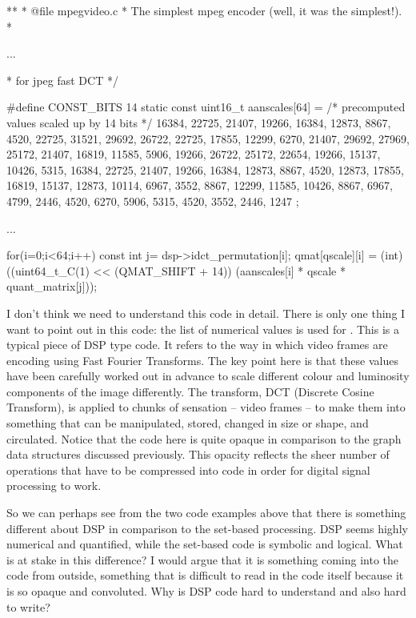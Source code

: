 \starttyping
**
* @file mpegvideo.c
* The simplest mpeg encoder (well, it was the simplest!).
*

...

* for jpeg fast DCT */

#define CONST_BITS 14
static const uint16_t aanscales[64] = {
    /* precomputed values scaled up by 14 bits */
    16384, 22725, 21407, 19266, 16384, 12873, 8867, 4520,
    22725, 31521, 29692, 26722, 22725, 17855, 12299, 6270,
    21407, 29692, 27969, 25172, 21407, 16819, 11585, 5906,
    19266, 26722, 25172, 22654, 19266, 15137, 10426, 5315,
    16384, 22725, 21407, 19266, 16384, 12873, 8867, 4520,
    12873, 17855, 16819, 15137, 12873, 10114, 6967, 3552,
    8867, 12299, 11585, 10426, 8867, 6967, 4799, 2446,
    4520, 6270, 5906, 5315, 4520, 3552, 2446, 1247
};

...

for(i=0;i<64;i++) {
           const int j=
dsp{}->}idct_permutation[i];
           qmat[qscale][i] = (int)((uint64_t_C(1)
<< (QMAT_SHIFT + 14))
                      (aanscales[i]
* qscale * quant_matrix[j]));
\stoptyping


I don't think we need to understand this code in detail. There is only
one thing I want to point out in this code: the list of 
numerical values is used for . This is a typical piece
of DSP type code. It refers to the way in which video frames are
encoding using Fast Fourier Transforms. The key point here is that
these values have been carefully worked out in advance to scale
different colour and luminosity components of the image differently.
The transform, DCT (Discrete Cosine Transform), is applied to chunks of
sensation {--} video frames {--} to make them into something that can
be manipulated, stored, changed in size or shape, and circulated.
Notice that the code here is quite opaque in comparison to the graph
data structures discussed previously. This opacity reflects the sheer
number of operations that have to be compressed into code in order for
digital signal processing to work.


So we can perhaps see from the two code examples above that there is
something different about DSP in comparison to the set{}-based
processing. DSP seems highly numerical and quantified, while the
set{}-based code is symbolic and logical. What is at stake in this
difference? I would argue that it is something coming into the code
from outside, something that is difficult to read in the code itself
because it is so opaque and convoluted. Why is DSP code hard to
understand and also hard to write? 

